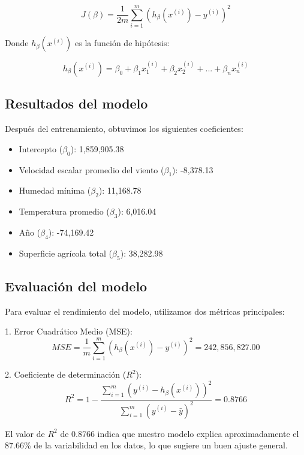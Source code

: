 \documentclass[11pt]{article}
\begin{document}
\begin{equation}
J(\beta) = \frac{1}{2m} \sum\limits_{i = 1}^{m} (h_\beta(x^{(i)}) - y^{(i)})^2
\end{equation}

Donde $h_\beta(x^{(i)})$ es la función de hipótesis:

\begin{equation}
h_\beta(x^{(i)}) = \beta_0 + \beta_1x_1^{(i)} + \beta_2x_2^{(i)} + ... + \beta_nx_n^{(i)}
\end{equation}

\subsection{Resultados del modelo}

Después del entrenamiento, obtuvimos los siguientes coeficientes:

\begin{itemize}
\item Intercepto ($\beta_0$): 1,859,905.38
\item Velocidad escalar promedio del viento ($\beta_1$): -8,378.13
\item Humedad mínima ($\beta_2$): 11,168.78
\item Temperatura promedio ($\beta_3$): 6,016.04
\item Año ($\beta_4$): -74,169.42
\item Superficie agrícola total ($\beta_5$): 38,282.98
\end{itemize}

\subsection{Evaluación del modelo}

Para evaluar el rendimiento del modelo, utilizamos dos métricas principales:

1. Error Cuadrático Medio (MSE):
\begin{equation}
MSE = \frac{1}{m} \sum\limits_{i = 1}^{m} (h_\beta(x^{(i)}) - y^{(i)})^2 = 242,856,827.00
\end{equation}

2. Coeficiente de determinación ($R^2$):
\begin{equation}
R^2 = 1 - \frac{\sum\limits_{i = 1}^{m} (y^{(i)} - h_\beta(x^{(i)}))^2}{\sum\limits_{i = 1}^{m} (y^{(i)} - \bar{y})^2} = 0.8766
\end{equation}

El valor de $R^2$ de 0.8766 indica que nuestro modelo explica aproximadamente el 87.66\% de la variabilidad en los datos, lo que sugiere un buen ajuste general.
\end{document}
